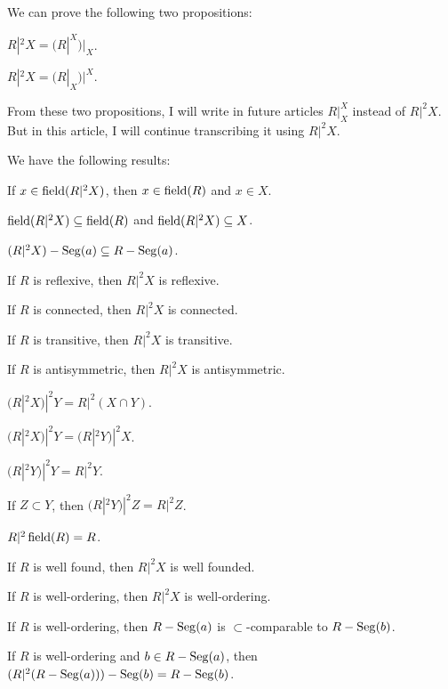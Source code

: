 \documentclass{article}
\begin{document}
We can prove the following two propositions:
\begin{thm}
\item\label{wellord1:10} $R|^{2}X=(R|^{X})|_{X}$.
\item\label{wellord1:11} $R|^{2}X=(R|_{X})|^{X}$.
\end{thm}

\begin{remark}
From these two propositions, I will write in future articles
$R|^{X}_{X}$ instead of $R|^{2}X$. But in this article, I will continue
transcribing it using $R|^{2}X$.
\end{remark}

We have the following results:
\begin{thm}
\item\label{wellord1:12} If $x\in\operatorname{field}(R|^{2}X)$, then $x\in\operatorname{field}(R)$
  and $x\in X$.
\item\label{wellord1:13} $\operatorname{field}(R|^{2}X)\subseteq\operatorname{field}(R)$ and
  $\operatorname{field}(R|^{2}X)\subseteq X$.
\item\label{wellord1:14} $(R|^{2}X)-\operatorname{Seg}(a)\subseteq R-\operatorname{Seg}(a)$.
\item\label{wellord1:15} If $R$ is reflexive, then $R|^{2}X$ is reflexive.
\item\label{wellord1:16} If $R$ is connected, then $R|^{2}X$ is connected.
\item\label{wellord1:17} If $R$ is transitive, then $R|^{2}X$ is transitive.
\item\label{wellord1:18} If $R$ is antisymmetric, then $R|^{2}X$ is antisymmetric.
\item\label{wellord1:19} $(R|^{2}X)|^{2}Y=R|^{2}(X\cap Y)$.
\item\label{wellord1:20} $(R|^{2}X)|^{2}Y=(R|^{2}Y)|^{2}X$.
\item\label{wellord1:21} $(R|^{2}Y)|^{2}Y=R|^{2}Y$.
\item\label{wellord1:22} If $Z\subset Y$, then $(R|^{2}Y)|^{2}Z=R|^{2}Z$.
\item\label{wellord1:23} $R|^{2}\operatorname{field}(R)=R$.
\item\label{wellord1:24} If $R$ is well found, then $R|^{2}X$ is well founded.
\item\label{wellord1:25} If $R$ is well-ordering, then $R|^{2}X$ is well-ordering.
\item\label{wellord1:26} If $R$ is well-ordering, then $R-\operatorname{Seg}(a)$ is
  $\subset$-comparable to $R-\operatorname{Seg}(b)$.
\item\label{wellord1:27} If $R$ is well-ordering and $b\in R-\operatorname{Seg}(a)$,
  then $(R|^{2}(R-\operatorname{Seg}(a)))-\operatorname{Seg}(b)=R-\operatorname{Seg}(b)$.

\end{thm}
\end{document}
